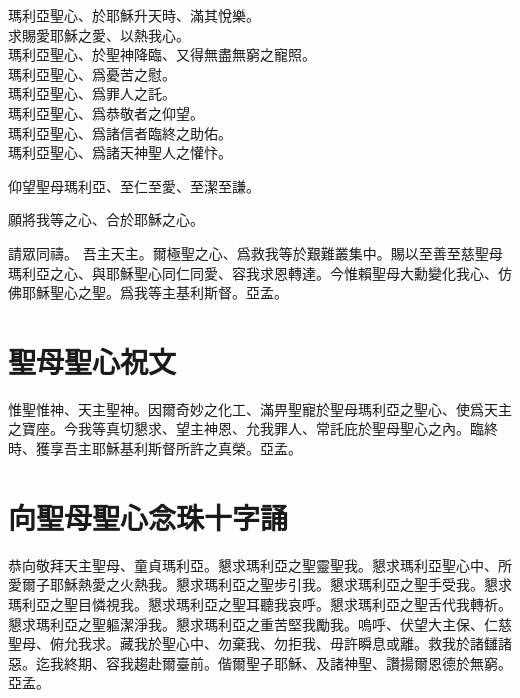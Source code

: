 \versicle 瑪利亞聖心、於耶穌升天時、滿其悅樂。\\
\hfill \response 求賜愛耶穌之愛、以熱我心。\\
瑪利亞聖心、於聖神降臨、又得無盡無窮之寵照。\\
瑪利亞聖心、爲憂苦之慰。\\
瑪利亞聖心、爲罪人之託。\\
瑪利亞聖心、爲恭敬者之仰望。\\
瑪利亞聖心、爲諸信者臨終之助佑。\\
瑪利亞聖心、爲諸天神聖人之懽忭。

\versicle 仰望聖母瑪利亞、至仁至愛、至潔至謙。

\Response 願將我等之心、合於耶穌之心。

請眾同禱。 吾主天主。爾極聖之心、爲救我等於艱難叢集中。賜以至善至慈聖母瑪利亞之心、與耶穌聖心同仁同愛、容我求恩轉達。今惟賴聖母大勳變化我心、仿佛耶穌聖心之聖。爲我等主基利斯督。{\cspace}亞孟。

\section*{聖母聖心祝文}
惟聖惟神、天主聖神。因爾奇妙之化工、滿畀聖寵於聖母瑪利亞之聖心、使爲天主之寶座。今我等真切懇求、望主神恩、允我罪人、常託庇於聖母聖心之內。臨終時、獲享吾主耶穌基利斯督所許之真榮。{\cspace}亞孟。

\section*{向聖母聖心念珠十字誦}
恭向敬拜天主聖母、童貞瑪利亞。懇求瑪利亞之聖靈聖我。懇求瑪利亞聖心中、所愛爾子耶穌熱愛之火熱我。懇求瑪利亞之聖步引我。懇求瑪利亞之聖手受我。懇求瑪利亞之聖目憐視我。懇求瑪利亞之聖耳聽我哀呼。懇求瑪利亞之聖舌代我轉祈。懇求瑪利亞之聖軀潔淨我。懇求瑪利亞之重苦堅我勵我。嗚呼、伏望大主保、仁慈聖母、俯允我求。藏我於聖心中、勿棄我、勿拒我、毋許瞬息或離。救我於諸讎諸惡。迄我終期、容我趨赴爾臺前。偕爾聖子耶穌、及諸神聖、讚揚爾恩德於無窮。{\cspace}亞孟。
